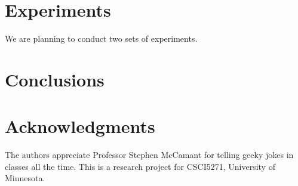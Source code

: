 \documentclass{sig-alternate-05-2015}
\begin{document}
\section{Experiments}
We are planning to conduct two sets of experiments.

\section{Conclusions}



\section{Acknowledgments}
The authors appreciate Professor Stephen McCamant for telling geeky jokes in classes all the time.
This is a research project for CSCI5271, University of Minnesota.


 
\end{document}
